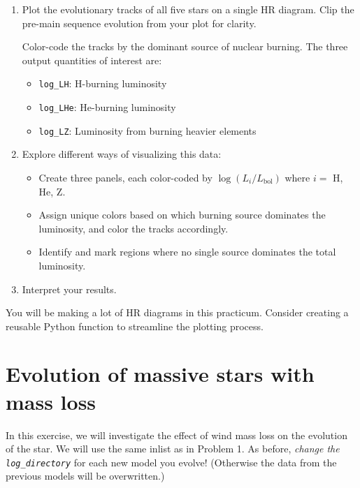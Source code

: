 \documentclass[11pt,a4paper]{article}
\begin{document}
\begin{enumerate}[label=(\alph*)]
    \item Plot the evolutionary tracks of all five stars on a single HR diagram. 
    Clip the pre-main sequence evolution from your plot for clarity.

    Color-code the tracks by the dominant source of nuclear burning. The three output quantities of interest are:
    \begin{itemize}
        \item \texttt{log\_LH}: H-burning luminosity
        \item \texttt{log\_LHe}: He-burning luminosity
        \item \texttt{log\_LZ}: Luminosity from burning heavier elements
    \end{itemize}
    \item Explore different ways of visualizing this data:
    \begin{itemize}[label=--]
        \item Create three panels, each color-coded by $\log (L_i/L_{\text{bol}})$ where $i = $ H, He, Z.
        \item Assign unique colors based on which burning source dominates the luminosity, and color the tracks accordingly.
        \item Identify and mark regions where no single source dominates the total luminosity.
    \end{itemize}

    \item Interpret your results. 

\end{enumerate}



\begin{tcolorbox}[protipbox]
You will be making a lot of HR diagrams in this practicum. Consider creating a reusable Python function to streamline the plotting process.
\end{tcolorbox}


\section{Evolution of massive stars with mass loss}

In this exercise, we will investigate the effect of wind mass loss on the evolution of the star. 
We will use the same inlist as in Problem 1. As before, \emph{change the \texttt{log\_directory}} for each new model you evolve! (Otherwise the data from the previous models will be overwritten.)
\end{document}
